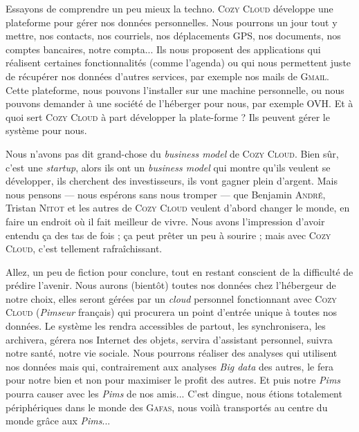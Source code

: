 Essayons de comprendre un peu mieux la techno. \textsc{Cozy Cloud} développe une plateforme pour gérer nos données personnelles. Nous pourrons un jour tout y mettre, nos contacts, nos courriels, nos déplacements GPS, nos documents, nos comptes bancaires, notre compta... Ils nous proposent des applications qui réalisent certaines fonctionnalités (comme l’agenda) ou qui nous permettent juste de récupérer nos données d’autres services, par exemple nos mails de \textsc{Gmail}. Cette plateforme, nous pouvons l’installer sur une machine personnelle, ou nous pouvons demander à une société de l’héberger pour nous, par exemple OVH. Et à quoi sert \textsc{Cozy Cloud} à part développer la plate-forme ? Ils peuvent gérer le système pour nous.

Nous n’avons pas dit grand-chose du \textit{business model} de \textsc{Cozy Cloud}. Bien sûr, c’est une \textit{startup}, alors ils ont un \textit{business model} qui montre qu’ils veulent se développer, ils cherchent des investisseurs, ils vont gagner plein d’argent. Mais nous pensons --- nous espérons sans nous tromper --- que Benjamin \textsc{André}, Tristan \textsc{Nitot} et les autres de \textsc{Cozy Cloud} veulent d’abord changer le monde, en faire un endroit où il fait meilleur de vivre. Nous avons l’impression d’avoir entendu ça des tas de fois ; ça peut prêter un peu à sourire ; mais avec \textsc{Cozy Cloud}, c’est tellement rafraîchissant.

Allez, un peu de fiction pour conclure, tout en restant conscient de la difficulté de prédire l’avenir. Nous aurons (bientôt) toutes nos données chez l’hébergeur de notre choix, elles seront gérées par un \textit{cloud} personnel fonctionnant avec \textsc{Cozy Cloud} (\textit{Pimseur} français) qui procurera un point d’entrée unique à toutes nos données. Le système les rendra accessibles de partout, les synchronisera, les archivera, gérera nos Internet des objets, servira d’assistant personnel, suivra notre santé, notre vie sociale. Nous pourrons réaliser des analyses qui utilisent nos données mais qui, contrairement aux analyses \textit{Big data} des autres, le fera pour notre bien et non pour maximiser le profit des autres. Et puis notre \textit{Pims} pourra causer avec les \textit{Pims} de nos amis...  C’est dingue, nous étions totalement périphériques dans le monde des \textsc{Gafas}, nous voilà transportés au centre du monde grâce aux \textit{Pims}...

